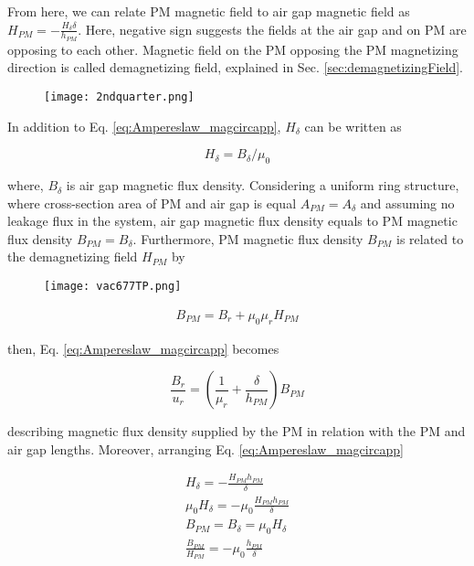 
From here, we can relate PM magnetic field to air gap magnetic field as $H_{PM} = -\frac{H_{\delta}\delta}{h_{PM}}$. Here, negative sign suggests the fields at the air gap and on PM are opposing to each other. Magnetic field on the PM opposing the PM magnetizing direction is called demagnetizing field, explained in Sec. \ref{sec:demagnetizingField}.

\begin{figure}[h]
    \centering
    \texttt{[image: 2ndquarter.png]}
    \label{fig:2ndquarter}
\end{figure}

In addition to Eq. \ref{eq:Ampereslaw_magcircapp}, $H_{\delta}$ can be written as

\begin{equation}
	H_{\delta} = B_{\delta}/\mu_{0}	
\end{equation}

where, $B_{\delta}$ is air gap magnetic flux density. Considering a uniform ring structure, where cross-section area of PM and air gap is equal $A_{PM} = A_{\delta}$ and assuming no leakage flux in the system, air gap magnetic flux density equals to PM magnetic flux density $B_{PM} = B_{\delta}$. Furthermore, PM magnetic flux density $B_{PM}$ is related to the demagnetizing field $H_{PM}$ by

\begin{figure}[h]
    \centering
    \texttt{[image: vac677TP.png]}
    \label{fig:vac677TP}
\end{figure}

\begin{eqnarray}
	B_{PM} = B_{r} + \mu_{0}\mu_{r}H_{PM}
\end{eqnarray}

then, Eq. \ref{eq:Ampereslaw_magcircapp} becomes

\begin{equation}
	\frac{B_{r}}{u_{r}} = (\frac{1}{\mu_{r}}+\frac{\delta}{h_{PM}})B_{PM}
\end{equation}

describing magnetic flux density supplied by the PM in relation with the PM and air gap lengths. Moreover, arranging Eq. \ref{eq:Ampereslaw_magcircapp}

\begin{eqnarray}
	H_{\delta} = -\frac{H_{PM}h_{PM}}{\delta} \\
	\mu_{0}	H_{\delta} = -\mu_{0} \frac{H_{PM}h_{PM}}{\delta} \\
	B_{PM} = B_{\delta} = \mu_{0} H_{\delta} \\
	\frac{B_{PM}}{H_{PM}} = -\mu_{0} \frac{h_{PM}}{\delta}
\end{eqnarray}

